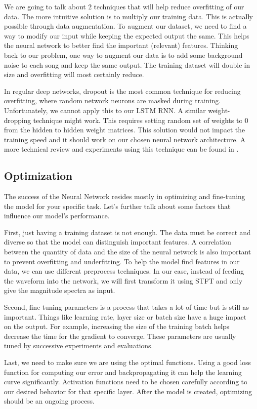 \documentclass[../Thesis.tex]{subfiles}
\begin{document}
We are going to talk about 2 techniques that will help reduce overfitting of our data. The more intuitive solution is to multiply our training data. This is actually possible through data augmentation. To augment our dataset, we need to find a way to modify our input while keeping the expected output the same. This helps the neural network to better find the important (relevant) features. Thinking back to our problem, one way to augment our data is to add some background noise to each song and keep the same output. The training dataset will double in size and overfitting will most certainly reduce.

In regular deep networks, dropout is the most common technique for reducing overfitting, where random network neurons are masked during training. Unfortunately, we cannot apply this to our LSTM RNN. A similar weight-dropping technique might work. This requires setting random set of weights to 0 from the hidden to hidden weight matrices. This solution would not impact the training speed and it should work on our chosen neural network architecture. A more technical review and experiments using this technique can be found in \cite{stephen} .


\subsection {Optimization}

The success of the Neural Network resides mostly in optimizing and fine-tuning the model for your specific task. Let’s further talk about some factors that influence our model’s performance.

First, just having a training dataset is not enough. The data must be correct and diverse so that the model can distinguish important features. A correlation between the quantity of data and the size of the neural network is also important to prevent overfitting and underfitting. To help the model find features in our data, we can use different preprocess techniques. In our case, instead of feeding the waveform into the network, we will first transform it using STFT and only give the magnitude spectra as input.

Second, fine tuning parameters is a process that takes a lot of time but is still as important. Things like learning rate, layer size or batch size have a huge impact on the output. For example, increasing the size of the training batch helps decrease the time for the gradient to converge. These parameters are usually tuned by successive experiments and evaluations. 

Last, we need to make sure we are using the optimal functions. Using a good loss function for computing our error and backpropagating it can help the learning curve significantly. Activation functions need to be chosen carefully according to our desired behavior for that specific layer. After the model is created, optimizing should be an ongoing process.
\end{document}
